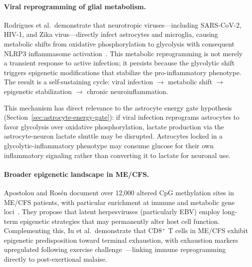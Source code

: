 \begin{speculation}
\paragraph{Viral reprogramming of glial metabolism.}
Rodrigues et al.\ demonstrate that neurotropic viruses---including SARS-CoV-2, HIV-1, and Zika virus---directly infect astrocytes and microglia, causing metabolic shifts from oxidative phosphorylation to glycolysis with consequent NLRP3 inflammasome activation~\cite{Rodrigues2025ViralReprogrammingGlialMetabolism}. This metabolic reprogramming is not merely a transient response to active infection; it persists because the glycolytic shift triggers epigenetic modifications that stabilize the pro-inflammatory phenotype. The result is a self-sustaining cycle: viral infection $\rightarrow$ metabolic shift $\rightarrow$ epigenetic stabilization $\rightarrow$ chronic neuroinflammation.

This mechanism has direct relevance to the astrocyte energy gate hypothesis (Section~\ref{sec:astrocyte-energy-gate}): if viral infection reprograms astrocytes to favor glycolysis over oxidative phosphorylation, lactate production via the astrocyte-neuron lactate shuttle may be disrupted. Astrocytes locked in a glycolytic-inflammatory phenotype may consume glucose for their own inflammatory signaling rather than converting it to lactate for neuronal use.

\paragraph{Broader epigenetic landscape in ME/CFS.}
Apostolou and Ros\'en document over 12,000 altered CpG methylation sites in ME/CFS patients, with particular enrichment at immune and metabolic gene loci~\cite{Apostolou2024EpigeneticReprogrammingMECFS}. They propose that latent herpesviruses (particularly EBV) employ long-term epigenetic strategies that may permanently alter host cell function. Complementing this, Iu et al.\ demonstrate that CD8$^+$ T cells in ME/CFS exhibit epigenetic predisposition toward terminal exhaustion, with exhaustion markers upregulated following exercise challenge~\cite{iu2024tcell_exhaustion}---linking immune reprogramming directly to post-exertional malaise.


\end{speculation}

